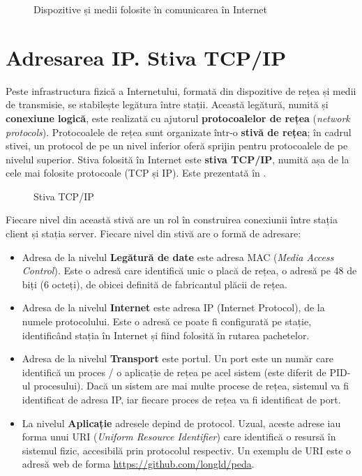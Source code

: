 \begin{figure}[htbp]
  \centering
  \def\svgwidth{\columnwidth}
  
  \caption{Dispozitive și medii folosite în comunicarea în Internet}
  \label{fig:net:device-connect}
\end{figure}

\section{Adresarea IP. Stiva TCP/IP}
\label{sec:net:tcp-ip}

Peste infrastructura fizică a Internetului, formată din dispozitive de rețea și medii de transmisie, se stabilește legătura între stații.
Această legătură, numită și \textbf{conexiune logică}, este realizată cu ajutorul \textbf{protocoalelor de rețea} (\textit{network protocols}).
Protocoalele de rețea sunt organizate într-o \textbf{stivă de rețea};
în cadrul stivei, un protocol de pe un nivel inferior oferă sprijin pentru protocoalele de pe nivelul superior.
Stiva folosită în Internet este \textbf{stiva TCP/IP}, numită așa de la cele mai folosite protocoale (TCP și IP).
Este prezentată în .

\begin{figure}[htbp]
  \centering
  \def\svgwidth{\columnwidth}
  
  \caption{Stiva TCP/IP}
  \label{fig:net:tcp-ip-stack}
\end{figure}

Fiecare nivel din această stivă are un rol în construirea conexiunii între stația client și stația server.
Fiecare nivel din stivă are o formă de adresare:

\begin{itemize}
  \item Adresa de la nivelul \textbf{Legătură de date} este adresa MAC  (\textit{Media Access Control}).
    Este o adresă care identifică unic o placă de rețea, o adresă pe 48 de biți (6 octeți), de obicei definită de fabricantul plăcii de rețea.
  \item Adresa de la nivelul \textbf{Internet} este adresa IP (Internet Protocol), de la numele protocolului. Este o adresă ce poate fi configurată pe stație, identificând stația în Internet și fiind folosită în rutarea pachetelor.
  \item Adresa de la nivelul \textbf{Transport} este portul. Un port este un număr care identifică un proces / o aplicație de rețea pe acel sistem (este diferit de PID-ul procesului).
    Dacă un sistem are mai multe procese de rețea, sistemul va fi identificat de adresa IP, iar fiecare proces de rețea va fi identificat de port.
  \item La nivelul \textbf{Aplicație} adresele depind de protocol.
    Uzual, aceste adrese iau forma unui URI  (\textit{Uniform Resource Identifier}) care identifică o resursă în sistemul fizic, accesibilă prin protocolul respectiv.
    Un exemplu de URI este o adresă web de forma \url{https://github.com/longld/peda}.
\end{itemize}

